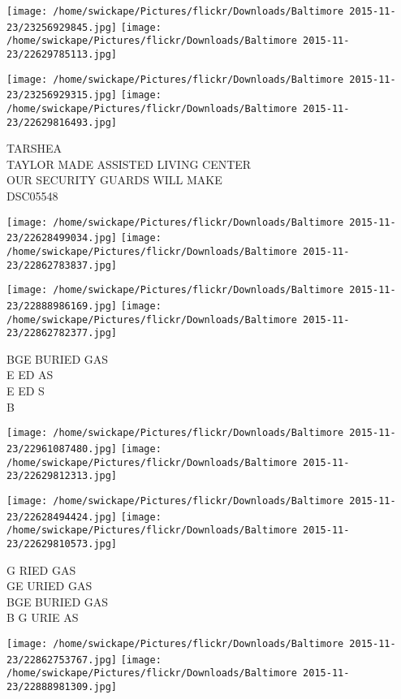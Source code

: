 \documentclass[10pt,letterpaper]{article}
\begin{document}
\texttt{[image: /home/swickape/Pictures/flickr/Downloads/Baltimore 2015-11-23/23256929845.jpg]}
\texttt{[image: /home/swickape/Pictures/flickr/Downloads/Baltimore 2015-11-23/22629785113.jpg]}

\texttt{[image: /home/swickape/Pictures/flickr/Downloads/Baltimore 2015-11-23/23256929315.jpg]}
\texttt{[image: /home/swickape/Pictures/flickr/Downloads/Baltimore 2015-11-23/22629816493.jpg]}

TARSHEA\\
TAYLOR MADE ASSISTED LIVING CENTER\\
OUR SECURITY GUARDS WILL MAKE\\
DSC05548\\
\pagebreak

\texttt{[image: /home/swickape/Pictures/flickr/Downloads/Baltimore 2015-11-23/22628499034.jpg]}
\texttt{[image: /home/swickape/Pictures/flickr/Downloads/Baltimore 2015-11-23/22862783837.jpg]}

\texttt{[image: /home/swickape/Pictures/flickr/Downloads/Baltimore 2015-11-23/22888986169.jpg]}
\texttt{[image: /home/swickape/Pictures/flickr/Downloads/Baltimore 2015-11-23/22862782377.jpg]}

BGE BURIED GAS\\
E ED AS\\
E ED S\\
B\\
\pagebreak

\texttt{[image: /home/swickape/Pictures/flickr/Downloads/Baltimore 2015-11-23/22961087480.jpg]}
\texttt{[image: /home/swickape/Pictures/flickr/Downloads/Baltimore 2015-11-23/22629812313.jpg]}

\texttt{[image: /home/swickape/Pictures/flickr/Downloads/Baltimore 2015-11-23/22628494424.jpg]}
\texttt{[image: /home/swickape/Pictures/flickr/Downloads/Baltimore 2015-11-23/22629810573.jpg]}

G RIED GAS\\
GE URIED GAS\\
BGE BURIED GAS\\
B G URIE AS\\
\pagebreak

\texttt{[image: /home/swickape/Pictures/flickr/Downloads/Baltimore 2015-11-23/22862753767.jpg]}
\texttt{[image: /home/swickape/Pictures/flickr/Downloads/Baltimore 2015-11-23/22888981309.jpg]}
\end{document}
